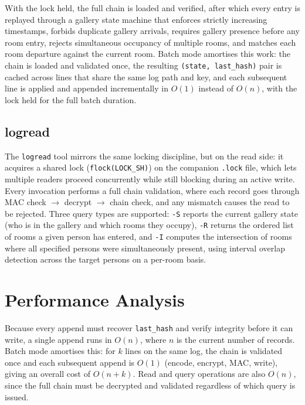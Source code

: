 \documentclass[a4paper, 12pt]{article}
\begin{document}
    With the lock held, the full chain is loaded and verified, after which every entry is replayed through a gallery state machine that enforces strictly increasing timestamps, forbids duplicate gallery arrivals, requires gallery presence before any room entry, rejects simultaneous occupancy of multiple rooms, and matches each room departure against the current room. Batch mode amortises this work: the chain is loaded and validated once, the resulting \texttt{(state, last\_hash)} pair is cached across lines that share the same log path and key, and each subsequent line is applied and appended incrementally in $O(1)$ instead of $O(n)$, with the lock held for the full batch duration.

    \subsection{logread}
    The \texttt{logread} tool mirrors the same locking discipline, but on the read side: it acquires a shared lock (\texttt{flock(LOCK\_SH)}) on the companion \texttt{.lock} file, which lets multiple readers proceed concurrently while still blocking during an active write. Every invocation performs a full chain validation, where each record goes through MAC check $\rightarrow$ decrypt $\rightarrow$ chain check, and any mismatch causes the read to be rejected. Three query types are supported: \texttt{-S} reports the current gallery state (who is in the gallery and which rooms they occupy), \texttt{-R} returns the ordered list of rooms a given person has entered, and \texttt{-I} computes the intersection of rooms where all specified persons were simultaneously present, using interval overlap detection across the target persons on a per-room basis.

    \section{Performance Analysis}
    Because every append must recover \texttt{last\_hash} and verify integrity before it can write, a single append runs in $O(n)$, where $n$ is the current number of records. Batch mode amortises this: for $k$ lines on the same log, the chain is validated once and each subsequent append is $O(1)$ (encode, encrypt, MAC, write), giving an overall cost of $O(n + k)$. Read and query operations are also $O(n)$, since the full chain must be decrypted and validated regardless of which query is issued.
\end{document}

